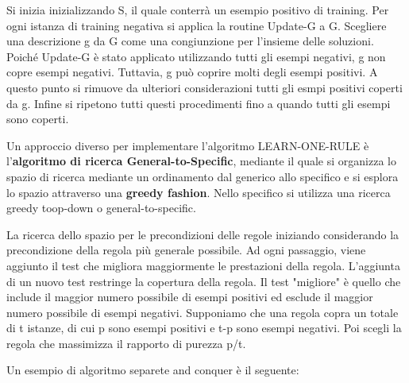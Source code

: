 \documentclass[a4paper]{extarticle}
\begin{document}
Si inizia inizializzando S, il quale conterrà un esempio positivo di training. Per ogni istanza di training negativa si applica la routine Update-G a G. Scegliere una descrizione g da G come una congiunzione per l'insieme delle soluzioni. Poiché Update-G è stato applicato utilizzando tutti gli esempi negativi, g non copre esempi negativi. Tuttavia, g può coprire molti degli esempi positivi. A questo punto si rimuove da ulteriori considerazioni tutti gli esmpi positivi coperti da g. Infine si ripetono tutti questi procedimenti fino a quando tutti gli esempi sono coperti.

Un approccio diverso per implementare l'algoritmo LEARN-ONE-RULE è l'\textbf{algoritmo di ricerca General-to-Specific}, mediante il quale si organizza lo spazio di ricerca mediante un ordinamento dal generico allo specifico e si esplora lo spazio attraverso una \textbf{greedy fashion}. Nello specifico si utilizza una ricerca greedy toop-down o general-to-specific. 

La ricerca dello spazio per le precondizioni delle regole iniziando considerando la precondizione della regola più generale possibile. Ad ogni passaggio, viene aggiunto il test che migliora maggiormente le prestazioni della regola. L'aggiunta di un nuovo test restringe la copertura della regola. Il test "migliore" è quello che include il maggior numero possibile di esempi positivi ed esclude il maggior numero possibile di esempi negativi. Supponiamo che una regola copra un totale di t istanze, di cui p sono esempi positivi e t-p sono esempi negativi. Poi scegli la regola che massimizza il rapporto di purezza p/t.

Un esempio di algoritmo separete and conquer è il seguente:

\begin{center}


\end{center}
\end{document}
